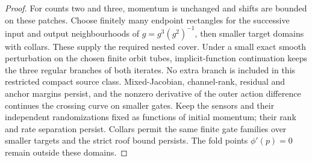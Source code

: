 \begin{proof}
For counts two and three, momentum is unchanged and shifts are bounded
on these patches. Choose finitely many endpoint rectangles for the
successive input and output neighbourhoods of $g=g^3(g^2)^{-1}$,
then smaller target domains with collars. These supply the required
nested cover. Under a small exact smooth perturbation on the chosen
finite orbit tubes, implicit-function continuation keeps the three
regular branches of both iterates. No extra branch is included in this
restricted compact source class. Mixed-Jacobian, channel-rank, residual
and anchor margins persist, and the nonzero derivative of the outer
action difference continues the crossing curve on smaller gates.
Keep the sensors and their independent randomizations fixed as
functions of initial momentum; their rank and rate separation persist.
Collars permit the same finite gate families over smaller targets and
the strict roof bound persists. The fold points $\phi'(p)=0$ remain
outside these domains.
\end{proof}

